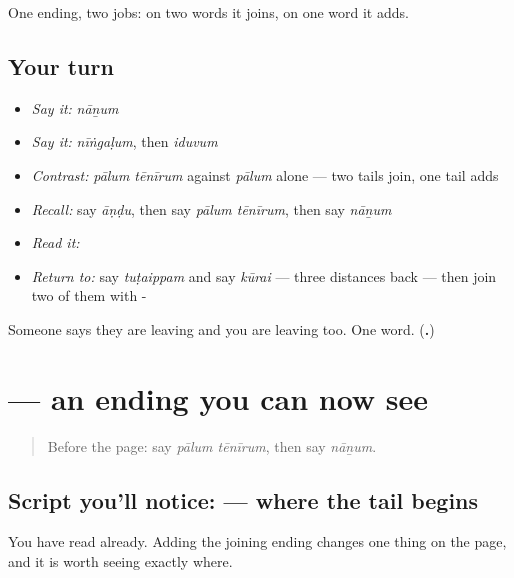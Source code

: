 \begin{grammarlens}[title={What you've built}]
One ending, two jobs: on two words it joins, on one word it adds.
\end{grammarlens}

\subsection*{Your turn}
\begin{itemize}
\raggedright
  \item \emph{Say it:} \emph{nāṉum}
  \item \emph{Say it:} \emph{nīṅgaḷum}, then \emph{iduvum}
  \item \emph{Contrast:} \emph{pālum tēnīrum} against \emph{pālum} alone — two tails join, one tail adds
  \item \emph{Recall:} say \emph{āṇḍu}, then say \emph{pālum tēnīrum}, then say \emph{nāṉum}
  \item \emph{Read it:} \textbf{}
  \item \emph{Return to:} say \emph{tuṭaippam} and say \emph{kūrai} — three distances back — then join two of them with -
\end{itemize}

\begin{tcolorbox}[breakable,colback=teal!4,colframe=teal!35!black,title={Before you move on}]
Someone says they are leaving and you are leaving too. One word. (\textbf{.})
\end{tcolorbox}
\section[\texorpdfstring{\ta{பாலும்} (pālum)}{பாலும் (pālum)}]{ — an ending you can now see}

\label{lesson:TA-W29-read-paalum}



\begin{quote}
Before the page: say \emph{pālum tēnīrum}, then say \emph{nāṉum}.
\end{quote}

\subsection*{Script you'll notice:  — where the tail begins}
You have read \textbf{} already. Adding the joining ending changes one thing on the page, and it is worth seeing exactly where.

